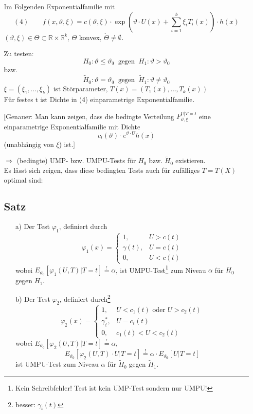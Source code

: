 \documentclass[a4paper,11pt,twoside,titlepage]{article}
\newcommand{\R}{{\mathbb R}}
\begin{document}
Im Folgenden Exponentialfamilie mit
\[(4)\qquad f(x,\vartheta,\xi)=c(\vartheta,\xi)\cdot\exp(\vartheta\cdot U(x)+\sum_{i=1}^k\xi_iT_i(x))\cdot h(x)\]
$(\vartheta,\xi)\in\Theta\subset\R\times\R^k$, $\Theta$ konvex, $\dot \Theta\neq\emptyset$.

Zu testen: \[H_0: \vartheta\leq\vartheta_0\ \mbox{ gegen }\ H_1: \vartheta>\vartheta_0\]
bzw.
\[\tilde H_0: \vartheta=\vartheta_0\ \mbox{ gegen }\ \tilde H_1: \vartheta\neq\vartheta_0\]
$\xi=(\xi_1,\ldots,\xi_k)$ ist Störparameter, $T(x)=(T_1(x),\ldots,T_k(x))$\\
Für festes t ist Dichte in (4) einparametrige Exponentialfamilie.

[Genauer: Man kann zeigen, dass die bedingte Verteilung $P_{\vartheta,\xi}^{U|T=t}$ eine einparametrige Exponentialfamilie mit Dichte
\[c_t(\vartheta)\cdot e^{\vartheta\cdot U}h(x)\]
(unabhängig von $\xi$) ist.]

$\Rightarrow$ (bedingte) UMP- bzw. UMPU-Tests für $H_0$ bzw. $\tilde H_0$ existieren.\\
Es lässt sich zeigen, dass diese bedingten Tests auch für zufälliges $T=T(X)$ optimal sind:

\subsection{Satz}
\begin{itemize}
\item[a)] Der Test $\varphi_1$, definiert durch
\[\varphi_1(x)=\left\{\begin{array}{cl}1,&U>c(t)\\\gamma(t),&U=c(t)\\0,&U<c(t)\end{array}\right.\]
wobei $E_{\vartheta_0}[\varphi_1(U,T)|T=t]\stackrel{!}{=}\alpha$, ist UMPU-Test\footnote{Kein Schreibfehler! Test ist kein UMP-Test sondern nur UMPU!} zum Niveau $\alpha$ für $H_0$ gegen $H_1$.
\item[b)] Der Test $\varphi_2$, definiert durch\footnote{besser: $\gamma_i(t)$}
\[\varphi_2(x)=\left\{\begin{array}{cl}1,&U<c_1(t)\mbox{ oder }U>c_2(t)\\\gamma_i^\ast,&U=c_i(t)\\0,&c_1(t)<U<c_2(t)\end{array}\right.\]
wobei $E_{\vartheta_0}[\varphi_2(U,T)|T=t]\stackrel{!}{=}\alpha$, $$E_{\vartheta_0}[\varphi_2(U,T)\cdot U|T=t]\stackrel{!}{=}\alpha\cdot E_{\vartheta_0}[U|T=t]$$ ist UMPU-Test zum Niveau $\alpha$ für $\tilde H_0$ gegen $\tilde H_1$.
\end{itemize}
\end{document}
